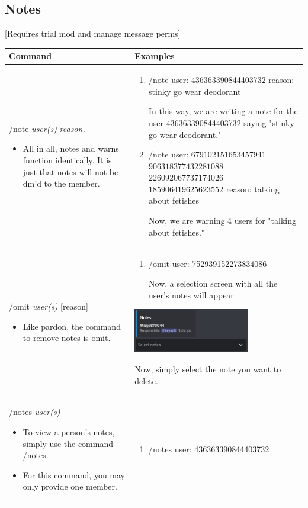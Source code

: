 \documentclass{scrartcl}
\begin{document}
\subsection{Notes} [Requires trial mod and manage message perms]
\begin{tabularx}{\textwidth}{|>{\raggedright\arraybackslash}X|>{\raggedright\arraybackslash}X|}
\hline 
Command & Examples\\
\hline
/note \textit{user(s)} \textit{reason.}

\begin{itemize}
    \item All in all, notes and warns function identically. It is just that notes will not be dm'd to the member.
\end{itemize}
& \begin{enumerate}
    \item 
    /note \color{black} user: \color{gray}436363390844403732 \color{black} reason: \color{gray}stinky go wear deodorant\color{black}
    
    In this way, we are writing a note for the user 436363390844403732 saying "stinky go wear deodorant."
    \item
    /note \color{black} user: \color{gray}$679102151653457941$ $906318377432281088$ $226092067737174026$ $185906419625623552$ \color{black} reason: \color{gray} talking about fetishes \color{black}
    
    Now, we are warning 4 users for "talking about fetishes."
\end{enumerate}\\
\hline
/omit \textit{user(s)} [reason]
\begin{itemize}
    \item Like pardon, the command to remove notes is omit.
\end{itemize}&
\begin{enumerate}
    \item /omit user: \color{gray} 752939152273834086  \color{black}
    
    Now, a selection screen with all the user's notes will appear 
\end{enumerate}
\begin{center}
    \includegraphics[width=2in]{images/omit.png}
\end{center}
\indent Now, simply select the note you want to delete.
\\
\hline
/notes \textit{user(s)}
\begin{itemize}
    \item To view a person's notes, simply use the command /notes.
    \item For this command, you may only provide one member.
\end{itemize}&
\begin{enumerate}
    \item /notes user: \color{gray}436363390844403732\color{black}
    

\end{enumerate}
\end{tabularx}
\end{document}
